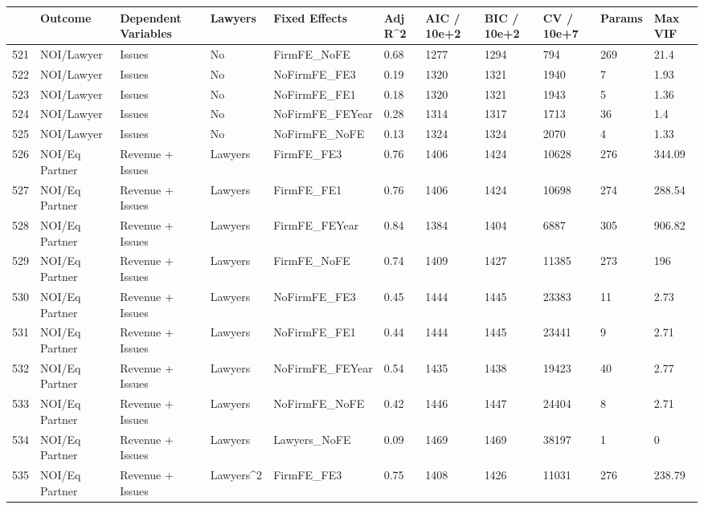\begin{table}[ht]
\centering
\begin{tabular}{rllllllllll}
  \hline
 & Outcome & Dependent Variables & Lawyers & Fixed Effects & Adj R^2 & AIC / 10e+2 & BIC / 10e+2 & CV / 10e+7 & Params & Max VIF \\ 
  \hline
521 & NOI/Lawyer & Issues & No & FirmFE\_NoFE & 0.68 & 1277 & 1294 & 794 & 269 & 21.4 \\ 
  522 & NOI/Lawyer & Issues & No & NoFirmFE\_FE3 & 0.19 & 1320 & 1321 & 1940 & 7 & 1.93 \\ 
  523 & NOI/Lawyer & Issues & No & NoFirmFE\_FE1 & 0.18 & 1320 & 1321 & 1943 & 5 & 1.36 \\ 
  524 & NOI/Lawyer & Issues & No & NoFirmFE\_FEYear & 0.28 & 1314 & 1317 & 1713 & 36 & 1.4 \\ 
  525 & NOI/Lawyer & Issues & No & NoFirmFE\_NoFE & 0.13 & 1324 & 1324 & 2070 & 4 & 1.33 \\ 
  526 & NOI/Eq Partner & Revenue + Issues & Lawyers & FirmFE\_FE3 & 0.76 & 1406 & 1424 & 10628 & 276 & 344.09 \\ 
  527 & NOI/Eq Partner & Revenue + Issues & Lawyers & FirmFE\_FE1 & 0.76 & 1406 & 1424 & 10698 & 274 & 288.54 \\ 
  528 & NOI/Eq Partner & Revenue + Issues & Lawyers & FirmFE\_FEYear & 0.84 & 1384 & 1404 & 6887 & 305 & 906.82 \\ 
  529 & NOI/Eq Partner & Revenue + Issues & Lawyers & FirmFE\_NoFE & 0.74 & 1409 & 1427 & 11385 & 273 & 196 \\ 
  530 & NOI/Eq Partner & Revenue + Issues & Lawyers & NoFirmFE\_FE3 & 0.45 & 1444 & 1445 & 23383 & 11 & 2.73 \\ 
  531 & NOI/Eq Partner & Revenue + Issues & Lawyers & NoFirmFE\_FE1 & 0.44 & 1444 & 1445 & 23441 & 9 & 2.71 \\ 
  532 & NOI/Eq Partner & Revenue + Issues & Lawyers & NoFirmFE\_FEYear & 0.54 & 1435 & 1438 & 19423 & 40 & 2.77 \\ 
  533 & NOI/Eq Partner & Revenue + Issues & Lawyers & NoFirmFE\_NoFE & 0.42 & 1446 & 1447 & 24404 & 8 & 2.71 \\ 
  534 & NOI/Eq Partner & Revenue + Issues & Lawyers & Lawyers\_NoFE & 0.09 & 1469 & 1469 & 38197 & 1 & 0 \\ 
  535 & NOI/Eq Partner & Revenue + Issues & Lawyers^2 & FirmFE\_FE3 & 0.75 & 1408 & 1426 & 11031 & 276 & 238.79 \\ 

\end{tabular}
\end{table}
